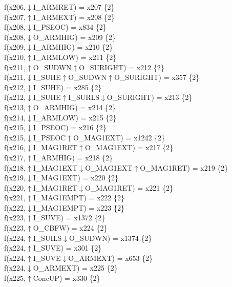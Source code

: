 f(x206,$\downarrow$I\_ARMRET) = x207 \{2\} \\  
f(x207,$\uparrow$I\_ARMEXT) = x208 \{2\} \\  
f(x208,$\downarrow$I\_PSEOC) = x834 \{2\} \\  
f(x208,$\downarrow$O\_ARMHIG) = x209 \{2\} \\  
f(x209,$\downarrow$I\_ARMHIG) = x210 \{2\} \\  
f(x210,$\uparrow$I\_ARMLOW) = x211 \{2\} \\  
f(x211,$\uparrow$O\_SUDWN$\uparrow$O\_SURIGHT) = x212 \{2\} \\  
f(x211,$\downarrow$I\_SUHE$\uparrow$O\_SUDWN$\uparrow$O\_SURIGHT) = x357 \{2\} \\  
f(x212,$\downarrow$I\_SUHE) = x285 \{2\} \\  
f(x212,$\downarrow$I\_SUHE$\uparrow$I\_SURLS$\downarrow$O\_SURIGHT) = x213 \{2\} \\  
f(x213,$\uparrow$O\_ARMHIG) = x214 \{2\} \\  
f(x214,$\downarrow$I\_ARMLOW) = x215 \{2\} \\  
f(x215,$\downarrow$I\_PSEOC) = x216 \{2\} \\  
f(x215,$\downarrow$I\_PSEOC$\uparrow$O\_MAG1EXT) = x1242 \{2\} \\  
f(x216,$\downarrow$I\_MAG1RET$\uparrow$O\_MAG1EXT) = x217 \{2\} \\  
f(x217,$\uparrow$I\_ARMHIG) = x218 \{2\} \\  
f(x218,$\uparrow$I\_MAG1EXT$\downarrow$O\_MAG1EXT$\uparrow$O\_MAG1RET) = x219 \{2\} \\  
f(x219,$\downarrow$I\_MAG1EXT) = x220 \{2\} \\  
f(x220,$\uparrow$I\_MAG1RET$\downarrow$O\_MAG1RET) = x221 \{2\} \\  
f(x221,$\uparrow$I\_MAG1EMPT) = x222 \{2\} \\  
f(x222,$\downarrow$I\_MAG1EMPT) = x223 \{2\} \\  
f(x223,$\uparrow$I\_SUVE) = x1372 \{2\} \\  
f(x223,$\uparrow$O\_CBFW) = x224 \{2\} \\  
f(x224,$\uparrow$I\_SUILS$\downarrow$O\_SUDWN) = x1374 \{2\} \\  
f(x224,$\uparrow$I\_SUVE) = x301 \{2\} \\  
f(x224,$\uparrow$I\_SUVE$\downarrow$O\_ARMEXT) = x653 \{2\} \\  
f(x224,$\downarrow$O\_ARMEXT) = x225 \{2\} \\  
f(x225,$\uparrow$ConcUP) = x330 \{2\} \\  
